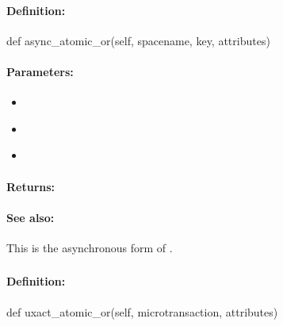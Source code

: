 \paragraph{Definition:}
\begin{pythoncode}
def async_atomic_or(self, spacename, key, attributes)
\end{pythoncode}

\paragraph{Parameters:}
\begin{itemize}[noitemsep]
\item {}\\

\item {}\\

\item {}\\

\end{itemize}

\paragraph{Returns:}


\paragraph{See also:}  This is the asynchronous form of .

\pagebreak
\subsubsection{}
\label{api:python:uxact_atomic_or}


\paragraph{Definition:}
\begin{pythoncode}
def uxact_atomic_or(self, microtransaction, attributes)
\end{pythoncode}

